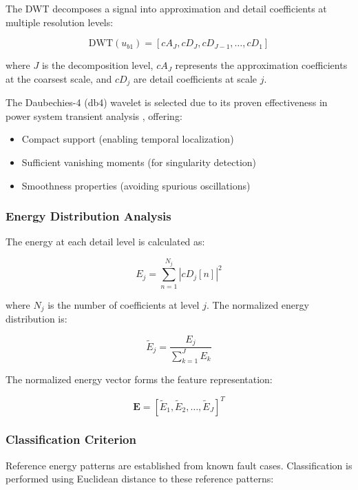 \documentclass[journal]{IEEEtran}
\begin{document}
The DWT decomposes a signal into approximation and detail coefficients at multiple resolution levels:

\begin{equation}
\text{DWT}(u_{b1}) = [cA_J, cD_J, cD_{J-1}, \ldots, cD_1]
\end{equation}

where $J$ is the decomposition level, $cA_J$ represents the approximation coefficients at the coarsest scale, and $cD_j$ are detail coefficients at scale $j$.

The Daubechies-4 (db4) wavelet is selected due to its proven effectiveness in power system transient analysis \cite{wavelet_power_systems, daubechies1992}, offering:
\begin{itemize}
\item Compact support (enabling temporal localization)
\item Sufficient vanishing moments (for singularity detection)
\item Smoothness properties (avoiding spurious oscillations)
\end{itemize}

\subsubsection{Energy Distribution Analysis}

The energy at each detail level is calculated as:

\begin{equation}
E_j = \sum_{n=1}^{N_j} |cD_j[n]|^2
\end{equation}

where $N_j$ is the number of coefficients at level $j$. The normalized energy distribution is:

\begin{equation}
\tilde{E}_j = \frac{E_j}{\sum_{k=1}^{J} E_k}
\end{equation}

The normalized energy vector forms the feature representation:

\begin{equation}
\mathbf{E} = [\tilde{E}_1, \tilde{E}_2, \ldots, \tilde{E}_J]^T
\end{equation}

\subsubsection{Classification Criterion}

Reference energy patterns are established from known fault cases. Classification is performed using Euclidean distance to these reference patterns:
\end{document}
